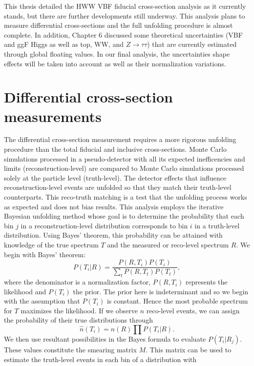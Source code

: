 This thesis detailed the HWW VBF fiducial cross-section analysis as it currently stands, but there are further developments still underway. This analysis plans to measure differential cross-sections and the full unfolding procedure is almost complete. In addition, Chapter 6 discussed some theoretical uncertainties (VBF and ggF Higgs as well as top, WW, and $Z\rightarrow \tau\tau$) that are currently estimated through global floating values. In our final analysis, the uncertainties shape effects will be taken into account as well as their normalization variations.

\section{Differential cross-section measurements}
The differential cross-section measurement requires a more rigorous unfolding procedure than the total fiducial and inclusive cross-sections. Monte Carlo simulations processed in a pseudo-detector with all its expected inefficencies and limits (reconstruction-level) are compared to Monte Carlo simulations processed solely at the particle level (truth-level). The detector effects that influence reconstruction-level events are unfolded so that they match their truth-level counterparts. This reco-truth matching is a test that the unfolding process works as expected and does not bias results. This analysis employs the iterative Bayesian unfolding method \cite{bayesian} whose goal is to determine the probability that each bin $j$ in a reconstruction-level distribution corresponds to bin $i$ in a truth-level distribution. Using Bayes' theorem, this probability can be attained with knowledge of the true spectrum $T$ and the measured or reco-level spectrum $R$. We begin with Bayes' theorem: 
\begin{equation}
P(T_i|R)=\frac{P(R,T_i)P(T_i)}{\sum_{t} P(R,T_t)P(T_t)},
\end{equation}
where the denominator is a normalization factor, $P(R,T_i)$ represents the likelihood and $P(T_i)$ the prior. The prior here is indeterminant and so we begin with the assumption that $P(T_i)$ is constant. Hence the most probable spectrum for $T$ maximizes the likelihood. If we observe $n$ reco-level events, we can assign the probability of their true distributions through
\begin{equation}
\hat{n}(T_i)=n(R)\prod P(T_i|R).
\end{equation}
We then use resultant possibilities in the Bayes formula to evaluate $P(T_i|R_j)$. These values constitute the smearing matrix $M$. This matrix can be used to estimate the truth-level events in each bin of a distribution with
